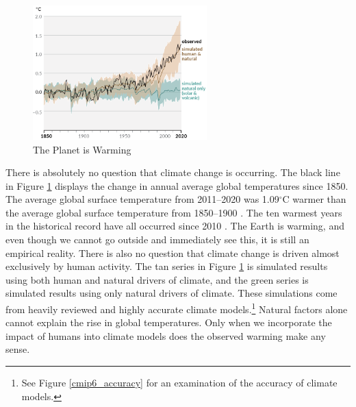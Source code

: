 \begin{figure}
\centering
\caption{The Planet is Warming\label{ipcc1}}
\includegraphics[width=0.6\textwidth]{figures/chapter1_figures/ipcc_fig1.png}
\vspace{1em}
\end{figure}

There is absolutely no question that climate change is occurring. The black line in Figure \ref{ipcc1} displays the change in annual average global temperatures since 1850. The average global surface temperature from 2011--2020 was 1.09$^\circ$C warmer than the average global surface temperature from 1850--1900 \citep{ipcc1_summary}. The ten warmest years in the historical record have all occurred since 2010 \citep{lindsey2023climate}. 
The Earth is warming, and even though we cannot go outside and immediately see this, it is still an empirical reality. There is also no question that climate change is driven almost exclusively by human activity. The tan series in Figure \ref{ipcc1} is simulated results using both human and natural drivers of climate, and the green series is simulated results using only natural drivers of climate. These simulations come from heavily reviewed and highly accurate climate models.\footnote{See Figure \ref{cmip6_accuracy} for an examination of the accuracy of climate models.} Natural factors alone cannot explain the rise in global temperatures. Only when we incorporate the impact of humans into climate models does the observed warming make any sense. 

